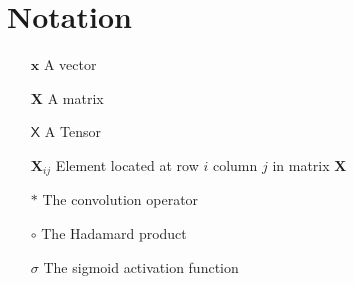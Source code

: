 \documentclass[./main.tex]{subfiles}
\begin{document}
\section*{Notation}
\begin{itemize}[leftmargin=2.0cm,labelsep=0.5cm]
    \item[$\bm{x}$] A vector
    \item[$\bm{X}$] A matrix
    \item[$\mathsf{X}$] A Tensor 
    \item[$\bm{X}_{ij}$] Element located at row $i$ column $j$ in matrix $\bm{X}$
    \item[$*$] The convolution operator
    \item[$\circ$] The Hadamard product  
    \item[$\sigma$] The sigmoid activation function 
\end{itemize}
\end{document}
